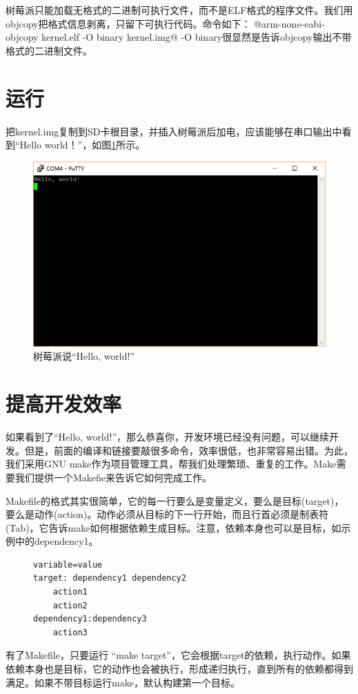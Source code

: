 \documentclass[main.tex]{subfiles}
\begin{document}
\begin{CJK*}{UTF8}{song}
树莓派只能加载无格式的二进制可执行文件，而不是ELF格式的程序文件。我们用objcopy把格式信息剥离，只留下可执行代码。命令如下：
@arm-none-eabi-objcopy kernel.elf -O binary kernel.img@
\noindent
-O binary很显然是告诉objcopy输出不带格式的二进制文件。
\section{运行}
把kernel.img复制到SD卡根目录，并插入树莓派后加电，应该能够在串口输出中看到“Hello world！”，如图\ref{figure:2-2}所示。

\begin{figure}[htp]
\centering
\includegraphics[scale=0.5]{figures/2-2.png}
\caption{树莓派说“Hello, world!”}
\label{figure:2-2}
\end{figure}

\section{提高开发效率}
\justify
如果看到了“Hello, world!”，那么恭喜你，开发环境已经没有问题，可以继续开发。但是，前面的编译和链接要敲很多命令，效率很低，也非常容易出错。为此，我们采用GNU make作为项目管理工具，帮我们处理繁琐、重复的工作。Make需要我们提供一个Makefie来告诉它如何完成工作。

\par
Makefile的格式其实很简单，它的每一行要么是变量定义，要么是目标(target)，要么是动作(action)。动作必须从目标的下一行开始，而且行首必须是制表符(Tab)，它告诉make如何根据依赖生成目标。注意，依赖本身也可以是目标，如示例中的dependency1。
\begin{figure}[htp]
\centering
\begin{minipage}{0.4\textwidth}
\begin{verbatim}
variable=value
target: dependency1 dependency2
    action1
    action2
dependency1:dependency3
    action3
\end{verbatim}
\end{minipage}
\end{figure}
\par
有了Makefile，只要运行 “make target”，它会根据target的依赖，执行动作。如果依赖本身也是目标，它的动作也会被执行，形成递归执行，直到所有的依赖都得到满足。如果不带目标运行make，默认构建第一个目标。


\end{CJK*}
\end{document}
